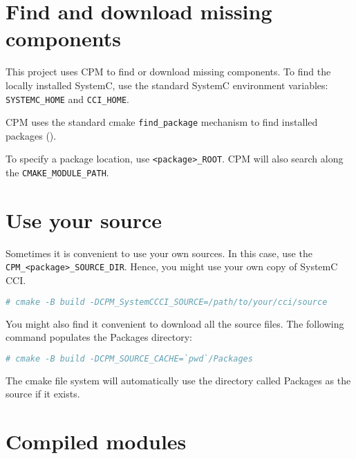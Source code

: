 \section{Find and download missing components}

This project uses CPM {} to find or download missing components. To find the locally installed SystemC, use the standard SystemC environment variables: {\small{\lstinline!SYSTEMC_HOME!}} and {\small{\lstinline!CCI_HOME!}}. \leavevmode

CPM uses the standard cmake {\small{\lstinline!find_package!}} mechanism to find installed packages ({}). \leavevmode

To specify a package location, use {\small{\lstinline!<package>_ROOT!}}. CPM will also search along the {\small{\lstinline!CMAKE_MODULE_PATH!}}. \leavevmode


\section{Use your source}

Sometimes it is convenient to use your own sources. In this case, use the {\small{\lstinline!CPM_<package>_SOURCE_DIR!}}. Hence, you might use your own copy of SystemC CCI.

\small
\begin{lstlisting}[language=bash]
    # cmake -B build -DCPM_SystemCCCI_SOURCE=/path/to/your/cci/source
\end{lstlisting}
\normalsize

You might also find it convenient to download all the source files. The following command populates the Packages directory:

\small
\begin{lstlisting}[language=bash]
    # cmake -B build -DCPM_SOURCE_CACHE=`pwd`/Packages
\end{lstlisting}
\normalsize

\note The cmake file system will automatically use the directory called Packages as the source if it exists.


\section{Compiled modules}

